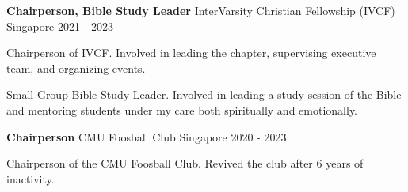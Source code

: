 

\begin{cventries}
    \cventry
    {\textbf{Chairperson, Bible Study Leader}} %
    {InterVarsity Christian Fellowship (IVCF)} %
    {Singapore} %
    {2021 - 2023} %
    { %
        \begin{cvitems}
            \item {Chairperson of IVCF. Involved in leading the chapter, supervising executive team, and organizing events.}
            \item {Small Group Bible Study Leader. Involved in leading a study session of the Bible and mentoring students under my care both spiritually and emotionally.}
        \end{cvitems}
    }
\end{cventries}

\begin{cventries}
	
	
	\cventry
	{\textbf{Chairperson}} %
	{CMU Foosball Club} %
	{Singapore} %
	{2020 - 2023} %
	{ %
		\begin{cvitems}
			\item {Chairperson of the CMU Foosball Club. Revived the club after 6 years of inactivity.}
		\end{cvitems}
	}
\end{cventries}


